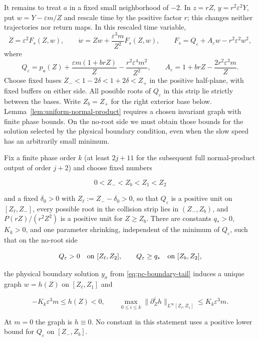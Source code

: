 It remains to treat $a$ in a fixed small neighborhood of $-2$.
In $z=rZ$, $y=r^2\varepsilon^2Y$, put $w=Y-\varepsilon m/Z$ and
rescale time by the positive factor $r$; this changes neither trajectories
nor return maps.  In this rescaled time variable,
\begin{equation}
\label{eq:pc-collision-system}
 \dot Z=\varepsilon^2F_s(Z,w),\qquad
 \dot w=Zw+\frac{\varepsilon^3m}{Z^2}F_s(Z,w),\qquad
 F_s=Q_\varepsilon+A_\varepsilon w-r^2\varepsilon^2w^2,
\end{equation}
where
\[
 Q_\varepsilon=p_a(Z)+\frac{\varepsilon m(1+brZ)}Z
               -\frac{r^2\varepsilon^4m^2}{Z^2},\qquad
 A_\varepsilon=1+brZ-\frac{2r^2\varepsilon^3m}{Z}.
\]
Choose fixed bases $Z_-<1-2\delta<1+2\delta<Z_+$ in the positive
half-plane, with fixed buffers on either side. All possible roots
of $Q_\varepsilon$ in this strip lie strictly between the bases.
Write $Z_b=Z_+$ for the right exterior base below.
Lemma~\ref{lem:uniform-normal-product} requires a chosen invariant
graph with finite phase bounds. On the no-root side we must obtain those
bounds for the solution selected by the physical boundary condition,
even when the slow speed has an arbitrarily small minimum.

\begin{lemma}
\label{lem:pc-no-root-tail}
Fix a finite phase order $k$ (at least $2j+11$ for the subsequent
full normal-product output of order $j+2$) and choose fixed numbers

\[
 0<Z_-<Z_b<Z_1<Z_2
\]

and a fixed $\delta_0>0$ with $Z_\ell:=Z_--\delta_0>0$, so that
$Q_\varepsilon$ is a positive unit on $[Z_\ell,Z_-]$, every possible
root in the collision strip lies in $(Z_-,Z_b)$, and
$P(rZ)/(r^2Z^2)$ is a positive unit for $Z\ge Z_b$.  There are constants
$q_*>0$, $K_k>0$, and one parameter shrinking, independent of the minimum
of $Q_\varepsilon$, such that on the no-root side

\[
 Q_\varepsilon>0\quad\hbox{on }[Z_\ell,Z_2],\qquad
 Q_\varepsilon\ge q_*\quad\hbox{on }[Z_b,Z_2],
\]

the physical boundary solution $y_\sigma$ from
\eqref{eq:pc-boundary-tail} induces a unique graph $w=h(Z)$ on
$[Z_\ell,Z_1]$ and

\[
 -K_k\varepsilon^3m\le h(Z)<0,\qquad
 \max_{0\le i\le k}\|\partial_Z^ih\|_{L^\infty[Z_\ell,Z_1]}
 \le K_k\varepsilon^3m .
\]

At $m=0$ the graph is $h\equiv0$.  No constant in this statement uses a
positive lower bound for $Q_\varepsilon$ on $[Z_-,Z_b]$.
\end{lemma}


